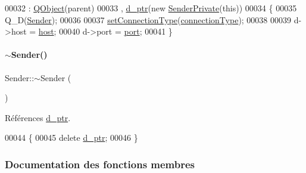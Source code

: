 \begin{DoxyCode}
00032                                                                                             : 
      \hyperlink{class_q_object}{QObject}(parent)
00033   , \hyperlink{class_simple_mail_1_1_sender_a0616c34e23dc61b19e5f50f43000669b}{d\_ptr}(\textcolor{keyword}{new} \hyperlink{class_simple_mail_1_1_sender_private}{SenderPrivate}(\textcolor{keyword}{this}))
00034 \{
00035     Q\_D(\hyperlink{class_simple_mail_1_1_sender}{Sender});
00036 
00037     \hyperlink{class_simple_mail_1_1_sender_a879bee44b1e7afed564c82b81261a9b1}{setConnectionType}(\hyperlink{class_simple_mail_1_1_sender_a044468efe3bafa577a3039b997a4ae23}{connectionType});
00038 
00039     d->host = \hyperlink{class_simple_mail_1_1_sender_a688b0cf38532aa73fa943fa4a8d9f797}{host};
00040     d->port = \hyperlink{class_simple_mail_1_1_sender_a9c30e23e4b14333276af1a8b265ccb3c}{port};
00041 \}
\end{DoxyCode}
\mbox{\label{class_simple_mail_1_1_sender_a99dd9c6aa7d546320d619aca9067fdc6}} 
\paragraph{\texorpdfstring{$\sim$\+Sender()}{~Sender()}}
{\footnotesize\ttfamily Sender\+::$\sim$\+Sender (\begin{DoxyParamCaption}{ }\end{DoxyParamCaption})\hspace{0.3cm}{\ttfamily [virtual]}}



Références \hyperlink{class_simple_mail_1_1_sender_a0616c34e23dc61b19e5f50f43000669b}{d\+\_\+ptr}.


\begin{DoxyCode}
00044 \{
00045     \textcolor{keyword}{delete} \hyperlink{class_simple_mail_1_1_sender_a0616c34e23dc61b19e5f50f43000669b}{d\_ptr};
00046 \}
\end{DoxyCode}


\subsubsection{Documentation des fonctions membres}
\mbox{\label{class_simple_mail_1_1_sender_a94ae37e550e1afdadc351a0dcd4167c8}} 
